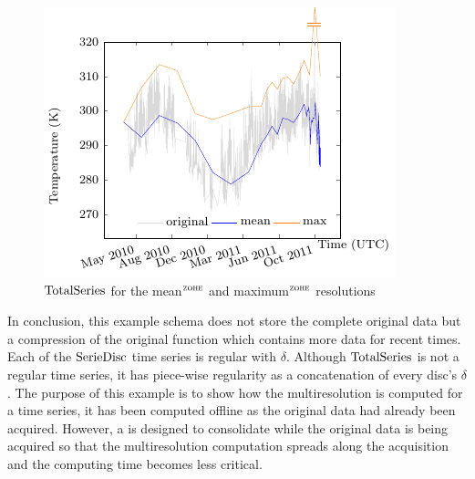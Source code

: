 \begin{figure}[tp]
  \centering
  \includegraphics{fig_exemple_4mrdtot.pdf}
  \caption{$\operatorname{TotalSeries}$ for the mean$^{\zohe}$ and maximum$^{\zohe}$
    resolutions}
  \label{fig:exemple:4mrdtot}
\end{figure}


In conclusion, this  example schema does not store the
complete original data but a compression of the original function
which contains more data for recent times.  Each of the
$\operatorname{SerieDisc}$ time series is regular with $\delta$. Although
$\operatorname{TotalSeries}$ is not a regular time series, it has piece-wise
regularity as a concatenation of every disc's $\delta$.  The purpose
of this example is to show how the multiresolution is computed for a
time series, it has been computed offline as the original data had
already been acquired. However, a  is designed to
consolidate while the original data is being acquired so that the
multiresolution computation spreads along the acquisition and the
computing time becomes less critical.



